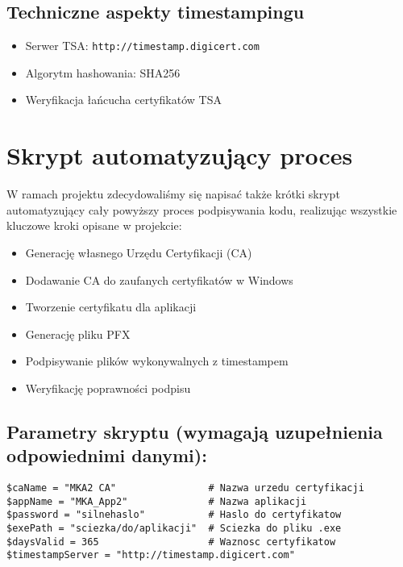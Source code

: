 \documentclass{article}
\begin{document}
\subsection{Techniczne aspekty timestampingu}
\begin{itemize}
    \item Serwer TSA: \texttt{http://timestamp.digicert.com}
    \item Algorytm hashowania: SHA256
    \item Weryfikacja łańcucha certyfikatów TSA \\
\end{itemize}

\section{Skrypt automatyzujący proces}
W ramach projektu zdecydowaliśmy się napisać także krótki skrypt automatyzujący cały powyższy proces podpisywania kodu, realizując wszystkie kluczowe kroki opisane w projekcie:

\begin{itemize}
    \item Generację własnego Urzędu Certyfikacji (CA)
    \item Dodawanie CA do zaufanych certyfikatów w Windows
    \item Tworzenie certyfikatu dla aplikacji
    \item Generację pliku PFX
    \item Podpisywanie plików wykonywalnych z timestampem
    \item Weryfikację poprawności podpisu \\
\end{itemize}

\subsection{Parametry skryptu (wymagają uzupełnienia odpowiednimi danymi):}

\begin{lstlisting}[]
$caName = "MKA2 CA"                # Nazwa urzedu certyfikacji
$appName = "MKA_App2"              # Nazwa aplikacji
$password = "silnehaslo"           # Haslo do certyfikatow
$exePath = "sciezka/do/aplikacji"  # Sciezka do pliku .exe
$daysValid = 365                   # Waznosc certyfikatow
$timestampServer = "http://timestamp.digicert.com"
\end{lstlisting}
\end{document}
